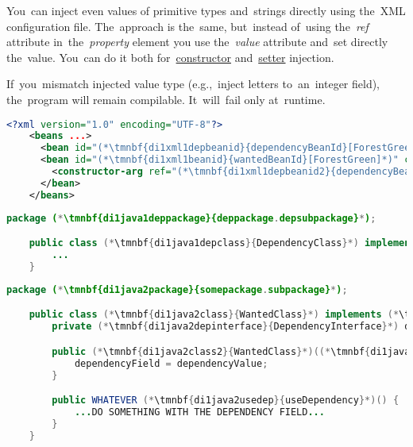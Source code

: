 \enlargethispage{20mm}
\thispagestyle{empty}
\label{injectingliteralvalues}
You~can inject even values of primitive types and~strings directly using the~XML configuration file.
The~approach is the~same, but~instead of~using the~\textit{ref} attribute in~the~\textit{property} element you use the~\textit{value} attribute and~set directly the~value.
You~can do it both for~\hyperref[constructorinjection]{constructor} and~\hyperref[setterinjection]{setter} injection.

\warning If~you~mismatch injected value type (e.g.,~inject letters to~an~integer field), the~program will remain compilable.
It~will~fail only at~runtime.
\newpage

\begin{lstlisting}[language=XML, title={Configuration XML}]
    <?xml version="1.0" encoding="UTF-8"?>
    <beans ...>
      <bean id="(*\tmnbf{di1xml1depbeanid}{dependencyBeanId}[ForestGreen]*)" class="(*\tmnbf{di1xml1deppackage}{deppackage.depsubpackage}[ForestGreen]*).(*\tmnbf{di1xml1depclass}{DependencyClass}[ForestGreen]*)"/>
      <bean id="(*\tmnbf{di1xml1beanid}{wantedBeanId}[ForestGreen]*)" class="(*\tmnbf{di1xml1package}{somepackage.subpackage}[ForestGreen]*).(*\tmnbf{di1xml1class}{WantedClass}[ForestGreen]*)">
        <constructor-arg ref="(*\tmnbf{di1xml1depbeanid2}{dependencyBeanId}[ForestGreen]*)"/>
      </bean>
    </beans>
\end{lstlisting}
\begin{lstlisting}[language=Java, title={Dependency class}]
    package (*\tmnbf{di1java1deppackage}{deppackage.depsubpackage}*);

    public class (*\tmnbf{di1java1depclass}{DependencyClass}*) implements (*\tmnbf{di1java1depinterface}{DependencyInterface}*) {
        ...
    }
\end{lstlisting}
\begin{lstlisting}[language=Java, title={Wanted class with the constructor}]
    package (*\tmnbf{di1java2package}{somepackage.subpackage}*);

    public class (*\tmnbf{di1java2class}{WantedClass}*) implements (*\tmnbf{di1java2interface}{WantedClassInterface}*) {
        private (*\tmnbf{di1java2depinterface}{DependencyInterface}*) dependencyField;

        public (*\tmnbf{di1java2class2}{WantedClass}*)((*\tmnbf{di1java2depinterface2}{DependencyInterface}*) dependencyValue) {
            dependencyField = dependencyValue;
        }

        public WHATEVER (*\tmnbf{di1java2usedep}{useDependency}*)() {
            ...DO SOMETHING WITH THE DEPENDENCY FIELD...
        }
    }
\end{lstlisting}
